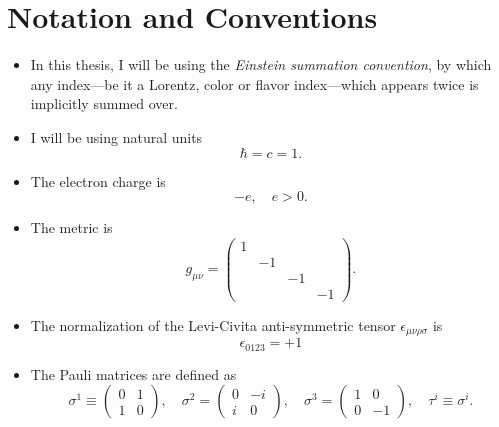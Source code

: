 	\vfill
	\newpage
	\chapter*{Notation and Conventions}
    \begin{itemize}
        \item In this thesis, I will be using the \textit{Einstein summation convention}, by which any index---be it a Lorentz, color or flavor index---which appears twice is implicitly summed over.
        \item I will be using natural units
        \begin{equation}
            \hbar = c = 1.
        \end{equation}
        \item The electron charge is
        \begin{equation}
            -e, \quad e > 0.
        \end{equation}
        \item The metric is
        \begin{equation}
            g_{\mu \nu} = \begin{pmatrix}
                1 & & & \\
                  & -1 & & \\
                  & & -1 & \\
                  & & & -1
            \end{pmatrix}.
        \end{equation}
        \item The normalization of the Levi-Civita anti-symmetric tensor $\epsilon_{\mu \nu \rho \sigma}$ is
        \begin{equation}
            \epsilon_{0123} = +1
        \end{equation}
        \item The Pauli matrices are defined as
        \begin{equation}
            \sigma^1 \equiv \begin{pmatrix}
                0 & 1 \\
                1 & 0
            \end{pmatrix}, \quad \sigma^2 = \begin{pmatrix}
                0 & - i \\
                i & 0
            \end{pmatrix}, \quad \sigma^3 = \begin{pmatrix}
                1 & 0 \\
                0 & -1
            \end{pmatrix}, \quad \tau^i \equiv \sigma^i.
        \end{equation}
    \end{itemize}

\endgroup

